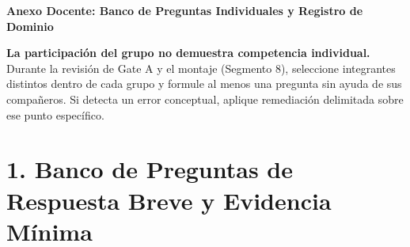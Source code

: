\documentclass[10pt, a4paper]{article}
\begin{document}
\begin{center}
    \Large\textbf{\textcolor{ucbblue}{Anexo Docente: Banco de Preguntas Individuales y Registro de Dominio}}
\end{center}

\begin{tcolorbox}[colback=yellow!10, colframe=ucbblue, title=\textbf{Regla de Verificación Individual}]
    \raggedright
    \textbf{La participación del grupo no demuestra competencia individual.} Durante la revisión de Gate A y el montaje (Segmento 8), seleccione integrantes distintos dentro de cada grupo y formule al menos una pregunta sin ayuda de sus compañeros. Si detecta un error conceptual, aplique remediación delimitada sobre ese punto específico.
\end{tcolorbox}

\section*{1. Banco de Preguntas de Respuesta Breve y Evidencia Mínima}
\end{document}
